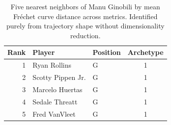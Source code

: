 \begin{table}[htbp]
  \centering\small
  \begin{tabular}{rllc}
    \toprule
    Rank & Player & Position & Archetype \\
    \midrule
    1 & Ryan Rollins & G & 1 \\
    2 & Scotty Pippen Jr. & G & 1 \\
    3 & Marcelo Huertas & G & 1 \\
    4 & Sedale Threatt & G & 1 \\
    5 & Fred VanVleet & G & 1 \\
    \bottomrule
  \end{tabular}
  \caption{Five nearest neighbors of Manu Ginobili by mean Fr\'{e}chet curve distance across metrics. Identified purely from trajectory shape without dimensionality reduction.}
  \label{tab:Manu_Ginobili_frechet_curve_neighbors}
\end{table}

